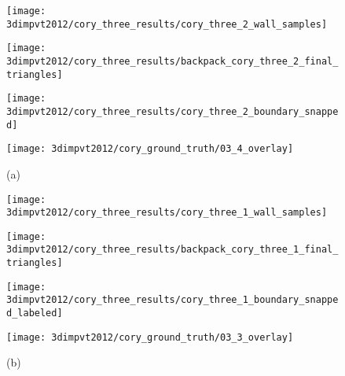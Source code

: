 \documentclass[12pt,onecolumn,oneside]{book}
\begin{document}
\begin{figure}[p]

\centering
\begin{minipage}[b]{0.24\linewidth}
  \centering
  \centerline{\texttt{[image: 3dimpvt2012/cory\_three\_results/cory\_three\_2\_wall\_samples]}}
\end{minipage}
\hfill
\begin{minipage}[b]{0.24\linewidth}
  \centering
  \centerline{\texttt{[image: 3dimpvt2012/cory\_three\_results/backpack\_cory\_three\_2\_final\_triangles]}}
\end{minipage}
\hfill
\begin{minipage}[b]{0.24\linewidth}
  \centering
  \centerline{\texttt{[image: 3dimpvt2012/cory\_three\_results/cory\_three\_2\_boundary\_snapped]}}
\end{minipage}
\hfill
\begin{minipage}[b]{0.24\linewidth}
  \centering
  \centerline{\texttt{[image: 3dimpvt2012/cory\_ground\_truth/03\_4\_overlay]}}
\end{minipage}
\centerline{(a)}
\linebreak

\begin{minipage}[b]{0.24\linewidth}
  \centering
  \centerline{\texttt{[image: 3dimpvt2012/cory\_three\_results/cory\_three\_1\_wall\_samples]}}
\end{minipage}
\hfill
\begin{minipage}[b]{0.24\linewidth}
  \centering
  \centerline{\texttt{[image: 3dimpvt2012/cory\_three\_results/backpack\_cory\_three\_1\_final\_triangles]}}
\end{minipage}
\hfill
\begin{minipage}[b]{0.24\linewidth}
  \centering
  \centerline{\texttt{[image: 3dimpvt2012/cory\_three\_results/cory\_three\_1\_boundary\_snapped\_labeled]}}
\end{minipage}
\hfill
\begin{minipage}[b]{0.24\linewidth}
  \centering
  \centerline{\texttt{[image: 3dimpvt2012/cory\_ground\_truth/03\_3\_overlay]}}
\end{minipage}
\centerline{(b)}
\linebreak


\end{figure}
\end{document}
